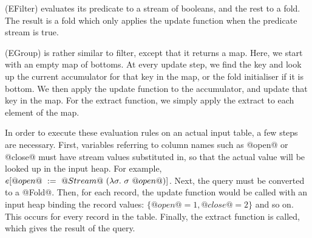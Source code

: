 (EFilter) evaluates its predicate to a stream of booleans, and the rest to a fold.
The result is a fold which only applies the update function when the predicate stream is true.

(EGroup) is rather similar to filter, except that it returns a map.
Here, we start with an empty map of bottoms.
At every update step, we find the key and look up the current accumulator for that key in the map, or the fold initialiser if it is bottom.
We then apply the update function to the accumulator, and update that key in the map.
For the extract function, we simply apply the extract to each element of the map.

In order to execute these evaluation rules on an actual input table, a few steps are necessary.
First, variables referring to column names such as @open@ or @close@ must have stream values substituted in, so that the actual value will be looked up in the input heap.
For example, $e[@open@~:=~@Stream@~(\lambda{}\sigma.~ \sigma~@open@)]$.
Next, the query must be converted to a @Fold@.
Then, for each record, the update function would be called with an input heap binding the record values: $\{@open@ = 1, @close@ = 2\}$ and so on.
This occurs for every record in the table.
Finally, the extract function is called, which gives the result of the query.

